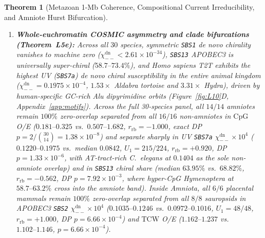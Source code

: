 \documentclass[11pt,a4paper]{article}
\renewcommand{\_}{\origunderscore\penalty200\relax}
\newtheorem{theorem}{Theorem}[section]
\theoremstyle{remark}
\begin{document}
\begin{theorem}[Metazoan 1-Mb Coherence, Compositional Current Irreducibility, and Amniote Hurst Bifurcation]
\begin{enumerate}
  \item \textbf{Whole-euchromatin COSMIC asymmetry and clade bifurcations (Theorem~L5e):} Across all $30$ species, symmetric \texttt{SBS1} de novo chirality vanishes to machine zero ($\chi_{--}^{\mathrm{dn}} < 2.61\times 10^{-34}$), \texttt{SBS13} APOBEC3 is universally super-chiral ($58.7\text{--}73.4\%$), and \textit{Homo sapiens} T2T exhibits the highest UV (\texttt{SBS7a}) de novo chiral susceptibility in the entire animal kingdom ($\chi_{--}^{\mathrm{dn}} = 0.1975\times 10^{-4}$, $1.53\times$ Aldabra tortoise and $3.31\times$ Hydra), driven by human-specific GC-rich \textit{Alu} dipyrimidine orbits (Figure~\ref{fig:L10}D, Appendix~\ref{app:motifs}). Across the full 30-species panel, all $14/14$ amniotes remain $100\%$ zero-overlap separated from all $16/16$ non-amniotes in $\mathrm{CpG}$ O/E ($0.181\text{--}0.325$ vs.\ $0.507\text{--}1.682$, $r_{\mathrm{rb}}=-1.000$, exact DP $p=2/\binom{30}{14}=1.38\times 10^{-8}$) and separate sharply in UV \texttt{SBS7a} $\chi_{--}^{\mathrm{dn}}\times 10^4$ ($0.1220\text{--}0.1975$ vs.\ median $0.0842$, $U_1=215/224$, $r_{\mathrm{rb}}=+0.920$, DP $p=1.33\times 10^{-6}$, with AT-tract-rich \textit{C.\ elegans} at $0.1404$ as the sole non-amniote overlap) and in \texttt{SBS13} chiral share (median $63.95\%$ vs.\ $68.82\%$, $r_{\mathrm{rb}}=-0.562$, DP $p=7.92\times 10^{-3}$, where hyper-CpG Hymenoptera at $58.7\text{--}63.2\%$ cross into the amniote band). Inside Amniota, all $6/6$ placental mammals remain $100\%$ zero-overlap separated from all $8/8$ sauropsids in APOBEC3 \texttt{SBS2} $\chi_{--}^{\mathrm{dn}}\times 10^4$ ($0.1035\text{--}0.1246$ vs.\ $0.0972\text{--}0.1016$, $U_1=48/48$, $r_{\mathrm{rb}}=+1.000$, DP $p=6.66\times 10^{-4}$) and $\mathrm{TCW}$ O/E ($1.162\text{--}1.237$ vs.\ $1.102\text{--}1.146$, $p=6.66\times 10^{-4}$).
\end{enumerate}
\end{theorem}
\end{document}
